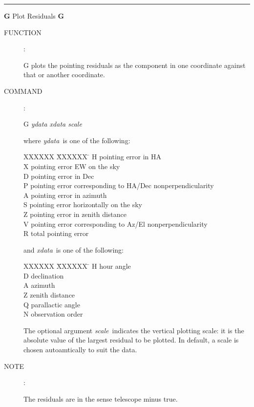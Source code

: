 \goodbreak
\rule{\textwidth}{0.3mm}
{\Large {\bf G} \hfill Plot Residuals \hfill {\bf G}}
\begin{description}
\item [FUNCTION]:

G plots the pointing residuals as the component in
one coordinate against that or another coordinate.

\item [COMMAND]:

\begin{cmd}
\> \> G {\it ydata xdata scale}
\end{cmd}

where {\it ydata}\, is one of the following:

\begin{tabs}
XXXXXX \= XXXXXX \= \kill
\> H \> pointing error in HA \\
\> X \> pointing error EW on the sky \\
\> D \> pointing error in Dec \\
\> P \> pointing error corresponding to HA/Dec nonperpendicularity \\
\> A \> pointing error in azimuth \\
\> S \> pointing error horizontally on the sky \\
\> Z \> pointing error in zenith distance \\
\> V \> pointing error corresponding to Az/El nonperpendicularity \\
\> R \> total pointing error
\end{tabs}

and {\it xdata}\, is one of the following:

\begin{tabs}
XXXXXX \= XXXXXX \= \kill
\> H \> hour angle \\
\> D \> declination \\
\> A \> azimuth \\
\> Z \> zenith distance \\
\> Q \> parallactic angle \\
\> N \> observation order
\end{tabs}

The optional argument {\it scale}\, indicates the vertical plotting
scale: it is the absolute value of the largest residual to be
plotted.  In default, a scale is chosen autoamtically to suit
the data.

\item [NOTE]:

The residuals are in the sense telescope minus true.

\end{description}

